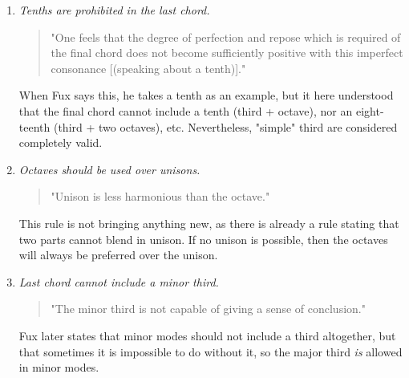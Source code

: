 \begin{enumerate}[wide, label=\bfseries 1.H\arabic*]
    \item\label{rule:tenth-is-last-chord} \reddot \textit{Tenths are prohibited in the last chord.}

    \begin{quotation}
    "One feels that the degree of perfection and repose which is required of the final chord does not become sufficiently positive with this imperfect consonance [(speaking about a tenth)]."
    \textcite[p.77]{GaPEng}
    \end{quotation}

    When Fux says this, he takes a tenth as an example, but it here understood that the final chord cannot include a tenth (third + octave), nor an eight-teenth (third + two octaves), etc. Nevertheless, "simple" third are considered completely valid.

    \item\label{rule:unison-vs-octave} \reddot \textit{Octaves should be used over unisons.}

    \begin{quotation}
    "Unison is less harmonious than the octave."
    \textcite[p.79]{GaPEng}
    \end{quotation}

    This rule is not bringing anything new, as there is already a rule stating that two parts cannot blend in unison. If no unison is possible, then the octaves will always be preferred over the unison.

    \item\label{rule:minor-third} \reddot \textit{Last chord cannot include a minor third.}

    \begin{quotation}
    "The minor third is not capable of giving a sense of conclusion."
    \textcite[p.80]{GaPEng}
    \end{quotation}

    Fux later states that minor modes should not include a third altogether, but that sometimes it is impossible to do without it, so the major third \textit{is} allowed in minor modes.

\end{enumerate}

